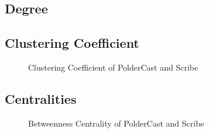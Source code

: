 \subsection{Degree}

\subsection{Clustering Coefficient}
\begin{figure}[Ht]
    \centering
    
    \caption{Clustering Coefficient of PolderCast and Scribe}
    \label{fig:eval_cc}
\end{figure}

\subsection{Centralities}
\begin{figure}[H]
    \centering
    
    \caption{Betweenness Centrality of PolderCast and Scribe}
    \label{fig:eval_betweenness}
\end{figure}

